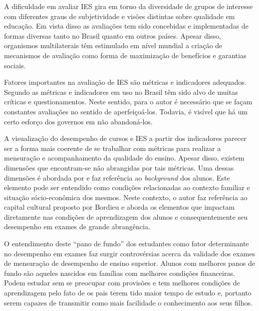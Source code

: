 A dificuldade em avaliar IES gira em torno da diversidade de grupos de interesse com diferentes graus de subjetividade e visões distintas sobre qualidade em educação. Em vista disso as avaliações tem sido concebidas e implementadas de formas diversas tanto no Brasil quanto em outros países. Apesar disso, organismos multilaterais têm estimulado em nível mundial a criação de mecanismos de avaliação como forma de maximização de benefícios e garantias sociais. \cite[p.~106]{Bertolin_Marcon_2015}

Fatores importantes na avaliação de IES são métricas e indicadores adequados. Segundo  as métricas e indicadores em uso no Brasil têm sido alvo de muitas críticas e questionamentos. Neste sentido, para o autor é necessário que se façam constantes avaliações no sentido de aperfeiçoá-los. Todavia, é visível que há um certo esforço dos governos em não abandoná-los.

A visualização do desempenho de cursos e IES a partir dos indicadores parecer ser a forma mais coerente de se trabalhar com métricas para realizar a mensuração e acompanhamento da qualidade do ensino. Apesar disso, existem dimensões que encontram-se não abrangidas por tais métricas. Uma dessas dimensões é abordada por  e faz referência ao \textit{background} dos alunos. Este elemento pode ser entendido como condições relacionadas ao contexto familiar e situação sócio-econômica dos mesmos. Neste contexto, o autor faz referência ao capital cultural proposto por Bordieu e aborda os elementos que impactam diretamente nas condições de aprendizagem dos alunos e consequentemente seu desempenho em exames de grande abrangência.

O entendimento deste ``pano de fundo'' dos estudantes como fator determinante no desempenho em exames faz surgir controvérsias acerca da validade dos exames de mensuração de desempenho de ensino superior. Alunos com melhores panos de fundo são aqueles nascidos em famílias com melhores condições financeiras. Podem estudar sem se preocupar com provisões e tem melhores condições de aprendizagem pelo fato de os pais terem tido maior tempo de estudo e, portanto serem capazes de transmitir como mais facilidade o conhecimento aos seus filhos.



\pagebreak











